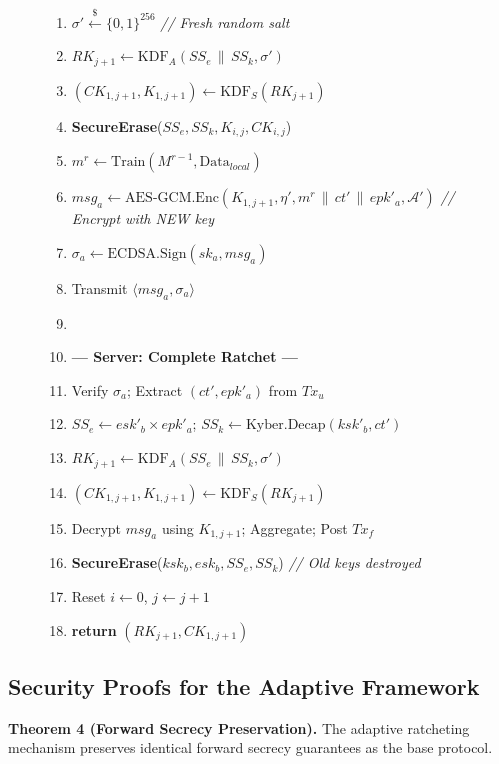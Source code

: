 \documentclass[journal, 10pt, twocolumn]{IEEEtran}
\begin{document}
\begin{figure}[!t]
\begin{enumerate}
    \item $\sigma' \xleftarrow{\$} \{0,1\}^{256}$ \quad \textit{// Fresh random salt}
    \item $RK_{j+1} \leftarrow \text{KDF}_A(SS_e \,\|\, SS_k, \sigma')$
    \item $(CK_{1,j+1}, K_{1,j+1}) \leftarrow \text{KDF}_S(RK_{j+1})$
    \item \textbf{SecureErase}($SS_e, SS_k, K_{i,j}, CK_{i,j}$)
    \item $m^r \leftarrow \text{Train}(M^{r-1}, \text{Data}_{local})$
    \item $msg_a \leftarrow \text{AES-GCM.Enc}(K_{1,j+1}, \eta', m^r \,\|\, ct' \,\|\, epk'_a, \mathcal{A}')$ \quad \textit{// Encrypt with NEW key}
    \item $\sigma_a \leftarrow \text{ECDSA.Sign}(sk_a, msg_a)$
    \item Transmit $\langle msg_a, \sigma_a \rangle$
    \item[]
    \item[] \textbf{--- Server: Complete Ratchet ---}
    \item Verify $\sigma_a$; Extract $(ct', epk'_a)$ from $Tx_u$
    \item $SS_e \leftarrow esk'_b \times epk'_a$; \quad $SS_k \leftarrow \text{Kyber.Decap}(ksk'_b, ct')$
    \item $RK_{j+1} \leftarrow \text{KDF}_A(SS_e \,\|\, SS_k, \sigma')$
    \item $(CK_{1,j+1}, K_{1,j+1}) \leftarrow \text{KDF}_S(RK_{j+1})$
    \item Decrypt $msg_a$ using $K_{1,j+1}$; Aggregate; Post $Tx_f$
    \item \textbf{SecureErase}($ksk_b, esk_b, SS_e, SS_k$) \quad \textit{// Old keys destroyed}
    \item Reset $i \leftarrow 0$, $j \leftarrow j+1$
    \item \textbf{return} $(RK_{j+1}, CK_{1,j+1})$
\end{enumerate}
\hrulefill
\end{figure}

\subsection{Security Proofs for the Adaptive Framework}

\textbf{Theorem 4 (Forward Secrecy Preservation).} The adaptive ratcheting mechanism preserves identical forward secrecy guarantees as the base protocol.
\end{document}
